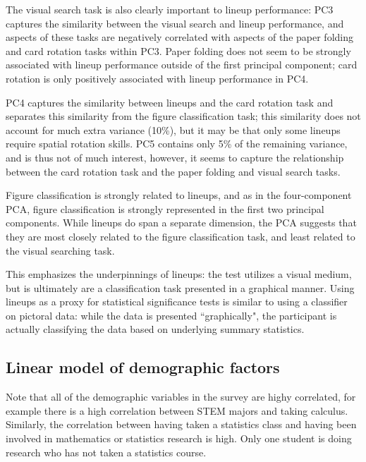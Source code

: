 \documentclass[11pt]{isuthesis}\usepackage[]{graphicx}\usepackage[]{color}
\begin{document}
The visual search task is also clearly important to lineup performance: PC3 captures the similarity between the visual search and lineup performance, and aspects of these tasks are negatively correlated with aspects of the paper folding and card rotation tasks within PC3. Paper folding does not seem to be strongly associated with lineup performance outside of the first principal component; card rotation is only positively associated with lineup performance in PC4.

PC4 captures the similarity between lineups and the card rotation task and separates this similarity from the figure classification task; this similarity does not account for much extra variance (10\%), but it may be that only some lineups require spatial rotation skills. PC5 contains only 5\% of the remaining variance, and is thus not of much interest, however, it seems to capture the relationship between the card rotation task and the paper folding and visual search tasks.


Figure classification is strongly related to lineups, and as in the four-component PCA, figure classification is strongly represented in the first two principal components. While lineups do span a separate dimension, the PCA suggests that they are most closely related to the figure classification task, and least related to the visual searching task.

% 
% 

This emphasizes the underpinnings of lineups: the test utilizes a visual medium, but is ultimately are a classification task presented in a graphical manner. Using lineups as a proxy for statistical significance tests is similar to using a classifier on pictoral data: while the data is presented ``graphically", the participant is actually classifying the data based on underlying summary statistics.


\subsection{Linear model of demographic factors}
Note that all of the demographic variables in the survey are highy correlated, for example there is a high correlation between STEM majors and taking calculus.
Similarly, the correlation  between having taken a statistics class and having been involved in mathematics or statistics research is high. Only one student is doing research who has not taken a statistics course. 
\end{document}
